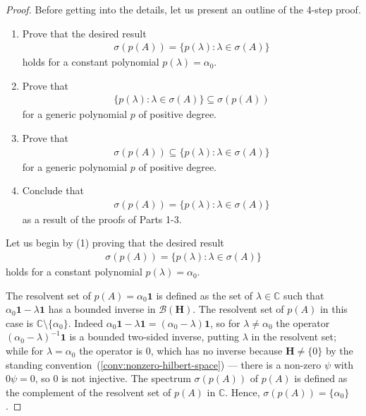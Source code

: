 \begin{proof}
    \leanok
Before getting into the details, let us present an outline of the 4-step proof.
\begin{enumerate}
    \item Prove that the desired result
    \begin{align}
        \sigma(p(A)) = \{ p(\lambda) : \lambda \in \sigma(A) \}
    \end{align}
    holds for a constant polynomial $p(\lambda) = \alpha_0$.
    \item Prove that
    \begin{align}
        \{ p(\lambda) : \lambda \in \sigma(A) \} \subseteq \sigma(p(A))
    \end{align}
    for a generic polynomial $p$ of positive degree.
    \item Prove that
    \begin{align}
        \sigma(p(A)) \subseteq \{ p(\lambda) : \lambda \in \sigma(A) \}
    \end{align}
    for a generic polynomial $p$ of positive degree.
    \item Conclude that
    \begin{align}
        \sigma(p(A)) = \{ p(\lambda) : \lambda \in \sigma(A) \}
    \end{align}
    as a result of the proofs of Parts 1-3.
\end{enumerate}
Let us begin by (1) proving that the desired result
\begin{align}
    \sigma(p(A)) = \{ p(\lambda) : \lambda \in \sigma(A) \}
\end{align}
holds for a constant polynomial $p(\lambda) = \alpha_0$.

The resolvent set of $p(A) = \alpha_0 \mathbf{1}$ is defined as the set of $\lambda \in \mathbb{C}$ such that $\alpha_0 \mathbf{1} - \lambda \mathbf{1}$ has a bounded inverse in $\mathcal{B}(\mathbf{H})$. The resolvent set of $p(A)$ in this case is $\mathbb{C} \setminus \{\alpha_0\}$. Indeed $\alpha_0\mathbf{1} - \lambda\mathbf{1} = (\alpha_0 - \lambda)\mathbf{1}$, so for $\lambda \ne \alpha_0$ the operator $(\alpha_0 - \lambda)^{-1}\mathbf{1}$ is a bounded two-sided inverse, putting $\lambda$ in the resolvent set; while for $\lambda = \alpha_0$ the operator is $0$, which has no inverse because $\mathbf{H} \ne \{0\}$ by the standing convention~(\ref{conv:nonzero-hilbert-space}) — there is a non-zero $\psi$ with $0\psi = 0$, so $0$ is not injective. The spectrum $\sigma(p(A))$ of $p(A)$ is defined as the complement of the resolvent set of $p(A)$ in $\mathbb{C}$. Hence, $\sigma(p(A)) = \{ \alpha_0 \}$.


\end{proof}
